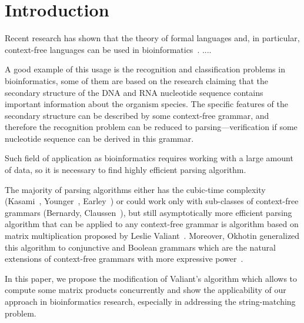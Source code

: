 \section{\bf Introduction}

Recent  research has  shown  that the theory of formal languages and, in particular, context-free languages can be used in bioinformatics~\cite{rivas,knudsen,yuan,dowell}. ....

A good example of this usage is the recognition and classification problems in bioinformatics, some of them are based on the research claiming that the secondary structure of the DNA and RNA nucleotide sequence contains important information about the organism species. The specific features of the secondary structure can be described by some context-free grammar, and therefore the recognition problem can be reduced to parsing---verification if some nucleotide sequence can be derived in this grammar.

Such field of application as bioinformatics requires working with a large amount of data, so it is necessary to find highly efficient parsing algorithm. 

The majority of parsing algorithms either has the cubic-time complexity (Kasami~\cite{Kas}, Younger~\cite{Younger:1966:CLP:1441427.1442019}, Earley~\cite{Earley:1970:ECP:362007.362035}) or could work only with sub-classes of context-free grammars (Bernardy, Claussen~\cite{Bernardy:2013:EDP:2544174.2500576}), but still asymptotically more efficient parsing algorithm that can be applied to any context-free grammar is algorithm based on matrix multiplication proposed by Leslie Valiant~\cite{Valiant:1975:GCR:1739932.1740048}. Moreover, Okhotin generalized this algorithm to conjunctive and Boolean grammars which are the natural extensions of context-free grammars with more expressive power~\cite{Okhotin:2014:PMM:2565359.2565379}. 

In this paper, we propose the modification of Valiant's algorithm which allows to compute some matrix products concurrently and show the applicability of our approach in bioinformatics research, especially in addressing the string-matching problem.